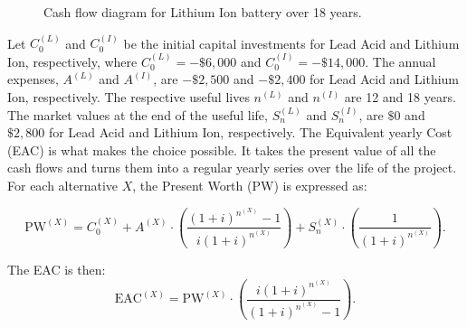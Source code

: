 \documentclass[12pt]{article}
\begin{document}
\begin{figure}[!ht]
    \centering
    \caption{Cash flow diagram for Lithium Ion battery over 18 years.}
    \label{fig:lithium-ion-battery-cash-flow}
\end{figure}
\newpage

Let \( C_0^{(L)} \) and \( C_0^{(I)} \) be the initial capital investments for Lead Acid and Lithium Ion, respectively, where \( C_0^{(L)} = -\$6,000 \) and \( C_0^{(I)} = -\$14,000 \). The annual expenses, \( A^{(L)} \) and \( A^{(I)} \), are \( -\$2,500 \) and \( -\$2,400 \) for Lead Acid and Lithium Ion, respectively. The respective useful lives \( n^{(L)} \) and \( n^{(I)} \) are 12 and 18 years. The market values at the end of the useful life, \( S_n^{(L)} \) and \( S_n^{(I)} \), are \( \$0 \) and \( \$2,800 \) for Lead Acid and Lithium Ion, respectively. The Equivalent yearly Cost (EAC) is what makes the choice possible. It takes the present value of all the cash flows and turns them into a regular yearly series over the life of the project. For each alternative \( X \), the Present Worth (PW) is expressed as:

\[ \text{PW}^{(X)} = C_0^{(X)} + A^{(X)} \cdot \left( \frac{(1 + i)^{n^{(X)}} - 1}{i(1 + i)^{n^{(X)}}} \right) + S_n^{(X)} \cdot \left( \frac{1}{(1 + i)^{n^{(X)}}} \right). \]

The EAC is then:
\[ \text{EAC}^{(X)} = \text{PW}^{(X)} \cdot \left( \frac{i(1 + i)^{n^{(X)}}}{(1 + i)^{n^{(X)}} - 1} \right). \]
\end{document}
